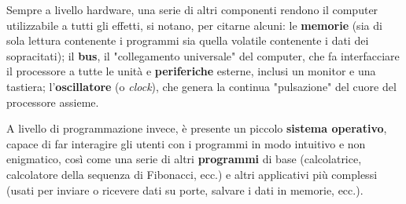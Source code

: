 Sempre a livello hardware, una serie di altri componenti rendono il computer utilizzabile a tutti gli effetti, si notano, per citarne alcuni: le \textbf{memorie} (sia di sola lettura contenente i programmi sia quella volatile contenente i dati dei sopracitati); il \textbf{bus}, il "collegamento universale" del computer, che fa interfacciare il processore a tutte le unità e \textbf{periferiche} esterne, inclusi un monitor e una tastiera; l'\textbf{oscillatore} (o \textit{clock}), che genera la continua "pulsazione" del cuore del processore assieme.

A livello di programmazione invece, è presente un piccolo \textbf{sistema operativo}, capace di far interagire gli utenti con i programmi in modo intuitivo e non enigmatico, così come una serie di altri \textbf{programmi} di base (calcolatrice, calcolatore della sequenza di Fibonacci, ecc.) e altri applicativi più complessi (usati per inviare o ricevere dati su porte, salvare i dati in memorie, ecc.).

\pagebreak
